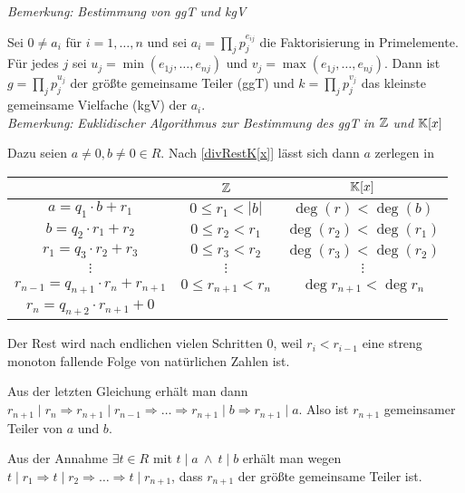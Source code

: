 
\textit{Bemerkung:} \textit{Bestimmung von ggT und kgV}

    Sei $0 \neq a_i$ für $i = 1, \ldots, n$ und sei $a_i = \prod\limits_j p_j^{e_{ij}}$ die Faktorisierung in Primelemente.
    Für jedes $j$ sei $u_j = \min(e_{1j}, \ldots, e_{nj})$ und $v_j = \max(e_{1j}, \ldots, e_{nj})$.
    Dann ist $g = \prod\limits_j p_j^{u_j}$ der größte gemeinsame Teiler (ggT) und $k = \prod\limits_j p_j^{v_j}$ das kleinste gemeinsame Vielfache (kgV) der $a_i$.\\


\textit{Bemerkung:} \textit{Euklidischer Algorithmus zur Bestimmung des ggT in $\mathbb{Z}$ und $\mathbb{K}[x]$}

    Dazu seien $a\neq0, b\neq0 \in R$. Nach \ref{divRestK[x]} lässt sich dann $a$ zerlegen in \par
    \begin{center}
        \begin{tabular}{ccc}
            & $\mathbb{Z}$ & $\mathbb{K}[x]$ \\ \hline
            $a=q_1\cdot b + r_1$ & $0\leq r_1 < |b|$ & $\deg(r)<\deg(b)$\\
            $b=q_2\cdot r_1 + r_2$ & $0\leq r_2 < r_1 $ & $\deg(r_2)<\deg(r_1)$ \\
            $r_1=q_3\cdot r_2 + r_3$ & $0\leq r_3 < r_2 $ & $\deg(r_3)<\deg(r_2)$\\
            $\vdots$ & $\vdots$ & $\vdots$ \\
            $r_{n-1}=q_{n+1}\cdot r_n + r_{n+1}$ & $0\leq r_{n+1}<r_n$ & $\deg r_{n+1}<\deg r_n$\\
            $r_{n}=q_{n+2}\cdot r_{n+1} + 0$ & &
        \end{tabular}
    \end{center}
    Der Rest wird nach endlichen vielen Schritten $0$, weil $r_i < r_{i-1}$ eine streng monoton fallende Folge von natürlichen Zahlen ist.

    Aus der letzten Gleichung erhält man dann $r_{n+1} \mid r_{n} \Rightarrow r_{n+1} \mid r_{n-1} \Rightarrow \ldots \Rightarrow r_{n+1} \mid b \Rightarrow r_{n+1} \mid a$.
    Also ist $r_{n+1}$ gemeinsamer Teiler von $a$ und $b$.

    Aus der Annahme $\exists t \in R$ mit $t \mid a \ \wedge \ t \mid b$ erhält man wegen $t \mid r_1\Rightarrow t \mid r_2\Rightarrow \ldots \Rightarrow t \mid r_{n+1}$,
    dass $r_{n+1}$ der größte gemeinsame Teiler ist.

